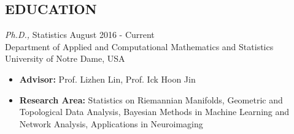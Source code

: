 \documentclass[margin, 10pt]{res} %
\begin{document}
\begin{resume}

% 

%
%

\section{\sf EDUCATION}

{\sl Ph.D.,} Statistics  \hfill August 2016 - Current \\
Department of Applied and Computational Mathematics and Statistics\\ University of Notre Dame, USA
\begin{itemize} \itemsep -1.0pt %
\item {\bf Advisor:} Prof. Lizhen Lin, Prof. Ick Hoon Jin
\item {\bf Research Area:} Statistics on Riemannian Manifolds, Geometric and Topological Data Analysis, Bayesian Methods in Machine Learning and Network Analysis, Applications in Neuroimaging 
\end{itemize}


\end{resume}
\end{document}
